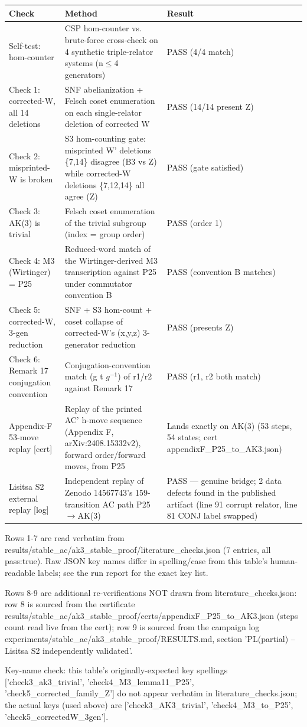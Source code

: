 \begin{tabular}{@{}p{}p{}p{}@{}}
\toprule
Check & Method & Result \\
\midrule
Self-test: hom-counter & CSP hom-counter vs. brute-force cross-check on 4 synthetic triple-relator systems (n$\le$4 generators) & PASS (4/4 match) \\
Check 1: corrected-W, all 14 deletions & SNF abelianization + Felsch coset enumeration on each single-relator deletion of corrected W & PASS (14/14 present Z) \\
Check 2: misprinted-W is broken & S3 hom-counting gate: misprinted W' deletions \{7,14\} disagree (B3 vs Z) while corrected-W deletions \{7,12,14\} all agree (Z) & PASS (gate satisfied) \\
Check 3: AK(3) is trivial & Felsch coset enumeration of the trivial subgroup (index = group order) & PASS (order 1) \\
Check 4: M3 (Wirtinger) = P25 & Reduced-word match of the Wirtinger-derived M3 transcription against P25 under commutator convention B & PASS (convention B matches) \\
Check 5: corrected-W, 3-gen reduction & SNF + S3 hom-count + coset collapse of corrected-W's (x,y,z) 3-generator reduction & PASS (presents Z) \\
Check 6: Remark 17 conjugation convention & Conjugation-convention match (g t $g^{-1}$) of r1/r2 against Remark 17 & PASS (r1, r2 both match) \\
Appendix-F 53-move replay [cert] & Replay of the printed AC' h-move sequence (Appendix F, arXiv:2408.15332v2), forward order/forward moves, from P25 & Lands exactly on AK(3) (53 steps, 54 states; cert appendixF\_P25\_to\_AK3.json) \\
Lisitsa S2 external replay [log] & Independent replay of Zenodo 14567743's 159-transition AC path P25$\to$AK(3) & PASS --- genuine bridge; 2 data defects found in the published artifact (line 91 corrupt relator, line 81 CONJ label swapped) \\
\bottomrule
\end{tabular}

\vspace{2pt}
{\footnotesize
Rows 1-7 are read verbatim from results/stable\_ac/ak3\_stable\_proof/literature\_checks.json (7 entries, all pass:true). Raw JSON key names differ in spelling/case from this table's human-readable labels; see the run report for the exact key list.\par
Rows 8-9 are additional re-verifications NOT drawn from literature\_checks.json: row 8 is sourced from the certificate results/stable\_ac/ak3\_stable\_proof/certs/appendixF\_P25\_to\_AK3.json (steps count read live from the cert); row 9 is sourced from the campaign log experiments/stable\_ac/ak3\_stable\_proof/RESULTS.md, section 'PL(partial) -- Lisitsa S2 independently validated'.\par
Key-name check: this table's originally-expected key spellings ['check3\_ak3\_trivial', 'check4\_M3\_lemma11\_P25', 'check5\_corrected\_family\_Z'] do not appear verbatim in literature\_checks.json; the actual keys (used above) are ['check3\_AK3\_trivial', 'check4\_M3\_to\_P25', 'check5\_correctedW\_3gen'].\par
}
